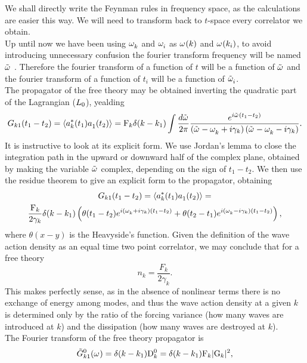 We shall directly write the Feynman rules in frequency space, as the calculations are easier this way. We will need to transform back to $t$-space every 
correlator we obtain.\\
Up until now we have been using $\omega^{}_k$ and $\omega^{}_i$ as $\omega^{}(k)$ and $\omega^{}(k_i)$, to avoid introducing unnecessary confusion the 
fourier transform frequency will be named $\tilde{\omega}^{}$ . Therefore the fourier transform of a function of $t$ will be a function of $\tilde{\omega}^{}$ and the fourier 
transform of a function of $t_i$ will be a function of $\tilde{\omega}^{}_i$. \\
The propagator of the free theory may be obtained inverting the quadratic part of the Lagrangian ($L_0$), yealding 
\begin{equation}
    G_{k1}(t_1 - t_2) = \langle a_k^{*}(t_1)a_1^{}(t_2)\rangle = \mathrm{F}_k \delta(k-k_1)\int \frac{d \tilde{\omega}^{}}{2\pi}\frac{e^{i\tilde{\omega}^{}(t_1 - t_2)}}
    {\left(\tilde{\omega}^{} -\omega^{}_k + i\gamma_k \right)\left(\tilde{\omega}^{} -\omega^{}_k-i \gamma_k\right)}. 
    \label{propspace}
\end{equation}
It is instructive to look at its explicit form. We use Jordan's lemma to close the integration path in the upward or downward half of the complex plane, obtained by 
making the variable $\tilde{\omega}^{}$ complex, depending on the sign of $t_1 - t_2$. We then use the residue theorem to give an explicit form to the propagator, obtaining
\begin{multline}
    G_{k1}(t_1 - t_2) = \langle a_k^{*}(t_1)a_1^{}(t_2)\rangle = \\
    \frac{\mathrm{F}_k}{2\gamma_k}\delta(k-k_1)\left(\theta(t_1-t_2)e^{i(\omega^{}_k + i\gamma_k)(t_1 - t_2)}
    +\theta(t_2-t_1)e^{i(\omega^{}_k - i\gamma_k)(t_1 - t_2)}\right),
\end{multline}  
where $\theta(x-y)$ is the Heavyside's function. Given the definition of the wave action density as an equal time two point correlator, we may conclude that for a 
free theory
\begin{equation}
    n_k = \frac{F_k}{2\gamma_k}.
    \label{freenwav}
\end{equation}
This makes perfectly sense, as in the absence of nonlinear terms there is no exchange of energy among modes, and thus the wave action density at a given $k$ is determined
only by the ratio of the forcing variance (how many waves are introduced at $k$) and the dissipation (how many waves are destroyed at $k$). \\
The Fourier transform of the free theory propagator is
\begin{equation}
    \tilde{G}^0_{k1}(\omega^{})=\delta(k-k_1)\mathrm{D}^0_k=\delta(k-k_1)\mathrm{F}_k|\mathrm{G}_k|^2,
    \label{prop}
\end{equation}  
